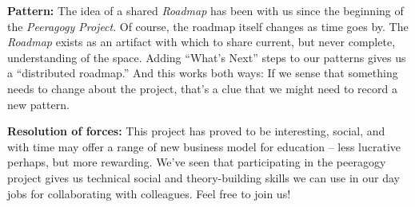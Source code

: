 \textbf{Pattern:}
The idea of a shared \emph{Roadmap} has been with us since the beginning of the \emph{Peeragogy Project}.  Of course, the roadmap itself changes as time goes by.  The \emph{Roadmap}  exists as an artifact with which to share current, but never complete,  understanding of the space. Adding “What’s Next” steps to our patterns gives us a “distributed  roadmap.” And this works both ways: If we sense that something needs to  change about the project, that’s a clue that we might need to record a  new pattern.

\textbf{Resolution of forces:}  
This project has proved to be interesting, social, and with time may offer a range of new business model for education -- less lucrative perhaps, but more rewarding.  We've seen that participating in the peeragogy project gives us technical social and theory-building skills we can use in our day jobs for collaborating with colleagues.   Feel free to join us!